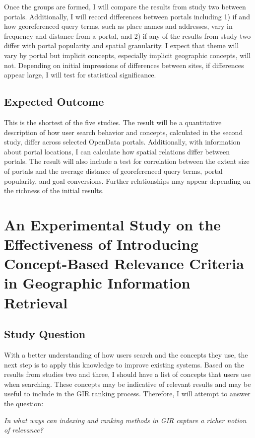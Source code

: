 Once the groups are formed, I will compare the results from study two between portals. Additionally, I will record differences between portals including 1) if and how georeferenced query terms, such as place names and addresses, vary in frequency and distance from a portal, and 2) if any of the results from study two differ with portal popularity and spatial granularity. I expect that theme will vary by portal but implicit concepts, especially implicit geographic concepts, will not. Depending on initial impressions of differences between sites, if differences appear large, I will test for statistical significance.

\subsection{Expected Outcome}
This is the shortest of the five studies. The result will be a quantitative description of how user search behavior and concepts, calculated in the second study, differ across selected OpenData portals. Additionally, with information about portal locations, I can calculate how spatial relations differ between portals. The result will also include a test for correlation between the extent size of portals and the average distance of georeferenced query terms, portal popularity, and goal conversions. Further relationships may appear depending on the richness of the initial results.

\section{An Experimental Study on the Effectiveness of Introducing Concept-Based Relevance Criteria in Geographic Information Retrieval}

\subsection{Study Question}
With a better understanding of how users search and the concepts they use, the next step is to apply this knowledge to improve existing systems. Based on the results from studies two and three, I should have a list of concepts that users use when searching. These concepts may be indicative of relevant results and may be useful to include in the GIR ranking process. Therefore, I will attempt to answer the question:
\linebreak

\emph{In what ways can indexing and ranking methods in GIR capture a richer notion of relevance?}
\linebreak

